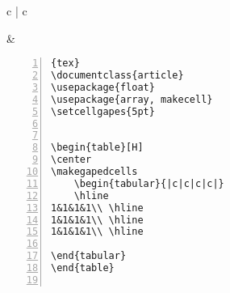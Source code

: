 \begin{tabular}{c | c}
\begin{minipage}[m]{0.4\textwidth}
\end{minipage}
&
\begin{minipage}[m]{0.55\textwidth}
\renewcommand\textminus{\mbox{-}}%
\begin{lstlisting}[numberstyle=\zebra{green!15}{yellow!15},numbers=left,basicstyle=\footnotesize]{tex}
\documentclass{article}
\usepackage{float}
\usepackage{array, makecell}
\setcellgapes{5pt}


\begin{table}[H]
\center
\makegapedcells
    \begin{tabular}{|c|c|c|c|}
    \hline
1&1&1&1\\ \hline
1&1&1&1\\ \hline
1&1&1&1\\ \hline
 
\end{tabular}
\end{table}


\end{lstlisting}
\end{minipage}
\end{tabular}

